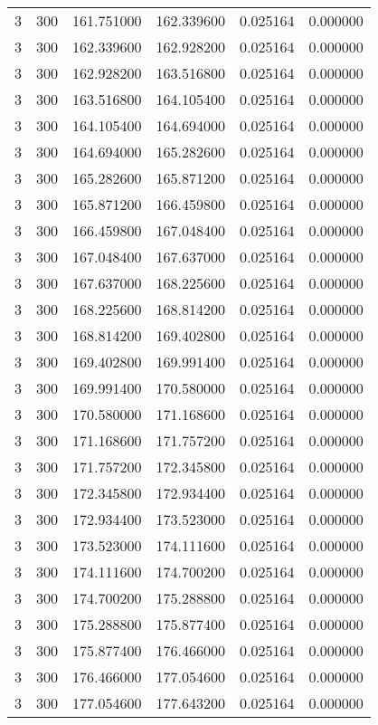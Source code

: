 \begin{longtable}{rrrrrr}
3 & 300 & 161.751000 & 162.339600 & 0.025164 & 0.000000 \\
3 & 300 & 162.339600 & 162.928200 & 0.025164 & 0.000000 \\
3 & 300 & 162.928200 & 163.516800 & 0.025164 & 0.000000 \\
3 & 300 & 163.516800 & 164.105400 & 0.025164 & 0.000000 \\
3 & 300 & 164.105400 & 164.694000 & 0.025164 & 0.000000 \\
3 & 300 & 164.694000 & 165.282600 & 0.025164 & 0.000000 \\
3 & 300 & 165.282600 & 165.871200 & 0.025164 & 0.000000 \\
3 & 300 & 165.871200 & 166.459800 & 0.025164 & 0.000000 \\
3 & 300 & 166.459800 & 167.048400 & 0.025164 & 0.000000 \\
3 & 300 & 167.048400 & 167.637000 & 0.025164 & 0.000000 \\
3 & 300 & 167.637000 & 168.225600 & 0.025164 & 0.000000 \\
3 & 300 & 168.225600 & 168.814200 & 0.025164 & 0.000000 \\
3 & 300 & 168.814200 & 169.402800 & 0.025164 & 0.000000 \\
3 & 300 & 169.402800 & 169.991400 & 0.025164 & 0.000000 \\
3 & 300 & 169.991400 & 170.580000 & 0.025164 & 0.000000 \\
3 & 300 & 170.580000 & 171.168600 & 0.025164 & 0.000000 \\
3 & 300 & 171.168600 & 171.757200 & 0.025164 & 0.000000 \\
3 & 300 & 171.757200 & 172.345800 & 0.025164 & 0.000000 \\
3 & 300 & 172.345800 & 172.934400 & 0.025164 & 0.000000 \\
3 & 300 & 172.934400 & 173.523000 & 0.025164 & 0.000000 \\
3 & 300 & 173.523000 & 174.111600 & 0.025164 & 0.000000 \\
3 & 300 & 174.111600 & 174.700200 & 0.025164 & 0.000000 \\
3 & 300 & 174.700200 & 175.288800 & 0.025164 & 0.000000 \\
3 & 300 & 175.288800 & 175.877400 & 0.025164 & 0.000000 \\
3 & 300 & 175.877400 & 176.466000 & 0.025164 & 0.000000 \\
3 & 300 & 176.466000 & 177.054600 & 0.025164 & 0.000000 \\
3 & 300 & 177.054600 & 177.643200 & 0.025164 & 0.000000 \\

\end{longtable}
